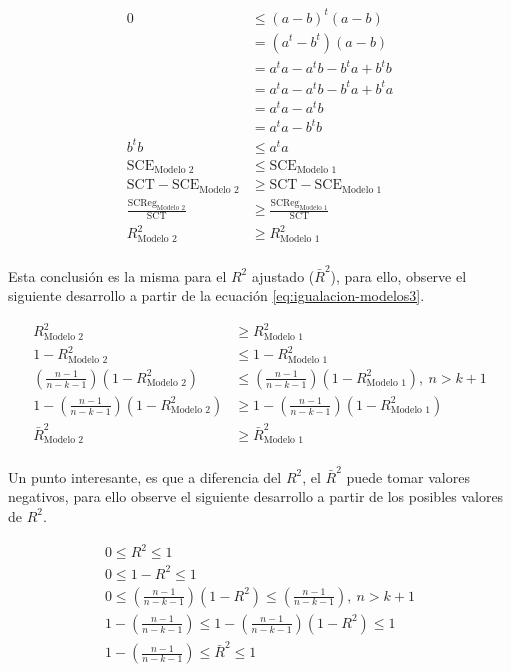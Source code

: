 \documentclass[
  11pt,
]{book}
\theoremstyle{definition}
\theoremstyle{definition}
\theoremstyle{definition}
\theoremstyle{definition}
\theoremstyle{remark}
\begin{document}
\begin{equation}
\begin{split}
0 &\leq (a-b)^t(a-b)\\
&= (a^t-b^t)(a-b)\\
&= a^ta - a^tb - b^ta + b^tb\\
&= a^ta - a^tb - b^ta + b^ta\\
&= a^ta - a^tb\\
&= a^ta - b^tb\\
b^tb &\leq a^ta\\
\text{SCE}_{\text{Modelo 2}} &\leq \text{SCE}_{\text{Modelo 1}}\\
\text{SCT} - \text{SCE}_{\text{Modelo 2}} &\geq \text{SCT} - \text{SCE}_{\text{Modelo 1}}\\
\frac{\text{SCReg}_{\text{Modelo 2}}}{\text{SCT}} &\geq \frac{\text{SCReg}_{\text{Modelo 1}}}{\text{SCT}}\\
R^2_{\text{Modelo 2}} &\geq R^2_{\text{Modelo 1}}\\
\end{split}
\label{eq:igualacion-modelos3}
\end{equation}

Esta conclusión es la misma para el \(R^2\) ajustado (\(\bar{R}^2\)), para ello, observe el siguiente desarrollo a partir de la ecuación \eqref{eq:igualacion-modelos3}.

\begin{equation}
\begin{split}
R^2_{\text{Modelo 2}} &\geq R^2_{\text{Modelo 1}}\\
1 - R^2_{\text{Modelo 2}} &\leq 1 - R^2_{\text{Modelo 1}}\\
\left( \frac{n-1}{n-k-1} \right) (1 - R^2_{\text{Modelo 2}}) &\leq \left( \frac{n-1}{n-k-1} \right) (1 - R^2_{\text{Modelo 1}}), \ n > k+1\\
1 - \left( \frac{n-1}{n-k-1} \right) (1 - R^2_{\text{Modelo 2}}) &\geq 1 - \left( \frac{n-1}{n-k-1} \right) (1 - R^2_{\text{Modelo 1}})\\
\bar{R}^2_{\text{Modelo 2}} &\geq \bar{R}^2_{\text{Modelo 1}}\\
\end{split}
\label{eq:igualacion-modelos4}
\end{equation}

Un punto interesante, es que a diferencia del \(R^2\), el \(\bar{R}^2\) puede tomar valores negativos, para ello observe el siguiente desarrollo a partir de los posibles valores de \(R^2\).

\begin{gather*}
0 \leq R^2 \leq 1\\
0 \leq 1 - R^2 \leq 1\\
0 \leq \left( \frac{n-1}{n-k-1} \right) (1 - R^2) \leq \left( \frac{n-1}{n-k-1} \right), \ n > k+1\\
1 - \left( \frac{n-1}{n-k-1} \right) \leq 1 - \left( \frac{n-1}{n-k-1} \right) (1 - R^2) \leq 1\\
1 - \left( \frac{n-1}{n-k-1} \right) \leq \bar{R}^2 \leq 1\\
\label{eq:igualacion-modelos5}
\end{gather*}
\end{document}
